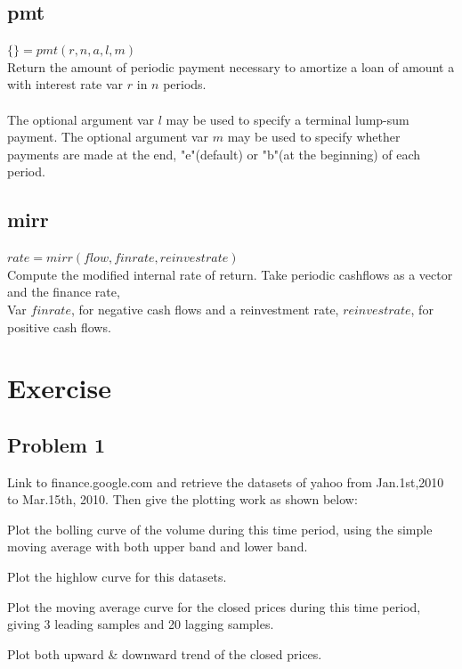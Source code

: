 \documentclass[11pt]{article}
\begin{document}
\subsection{pmt}
$\{\} = pmt (r, n, a, l, m)$
\\ Return the amount of periodic payment necessary to amortize a loan of amount a with interest rate var $r$ in $n$ periods.
\\
\\The optional argument var $l$ may be used to specify a terminal lump-sum payment. The optional argument var $m$ may be used to specify whether payments are made at the end, "e"(default) or "b"(at the beginning) of each period.

\subsection{mirr}
$rate = mirr (flow, finrate, reinvestrate)$
\\ Compute the modified internal rate of return. Take periodic cashflows as a vector and the finance rate,
\\Var $finrate$, for negative cash flows and a reinvestment rate, $reinvestrate$, for positive cash flows.

\section{Exercise}
\subsection{Problem 1}
Link to finance.google.com and retrieve the datasets of yahoo from Jan.1st,2010 to Mar.15th, 2010. Then give the plotting work as shown below:

\begin{enumerate}[{[}1{]}]
\item Plot the bolling curve of the volume during this time period, using the simple moving average with both upper band and lower band.
\item Plot the highlow curve for this datasets.
\item Plot the moving average curve for the closed prices during this time period, giving 3 leading samples and 20 lagging samples.
\item Plot both upward \& downward trend of the closed prices.
\end{enumerate}
\end{document}
